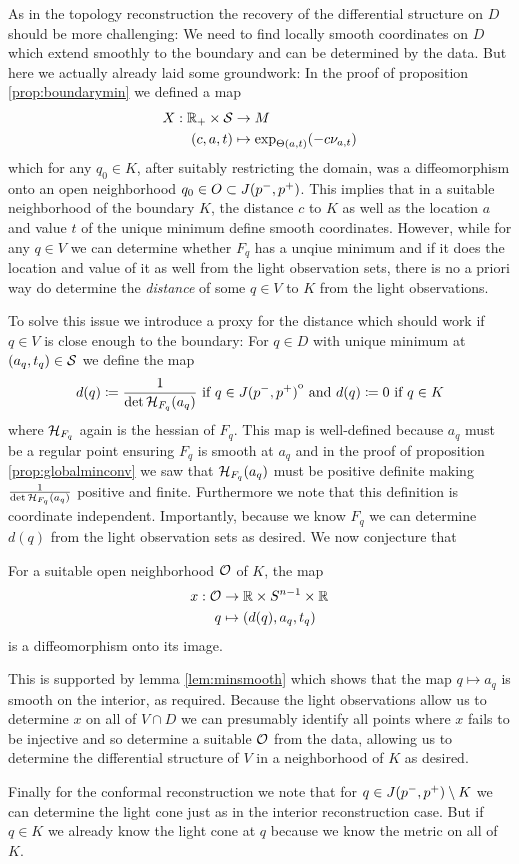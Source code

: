 As in the topology reconstruction the recovery of the differential structure on $D$ should be more challenging: We need to find locally smooth coordinates on $D$ which extend smoothly to the boundary and can be determined by the data. But here we actually already laid some groundwork: In the proof of proposition \ref{prop:boundarymin} we defined a map 
\begin{align*}
    X:\mathbb{R}_+\times {\mathcal{S}} &\to M \\
    (c,a,t)&\mapsto \exp_{\Theta(a,t)}(-c\nu_{a,t})
\end{align*}which for any $q_0\in K$, after suitably restricting the domain, was a diffeomorphism onto an open neighborhood $q_0\in O \subset J(p^-,p^+)$. This implies that in a suitable neighborhood of the boundary $K$, the distance $c$ to $K$ as well as the location $a$ and value $t$ of the unique minimum define smooth coordinates. However, while for any $q\in V$ we can determine whether $F_q$ has a unqiue minimum and if it does the location and value of it as well from the light observation sets, there is no a priori way do determine the \emph{distance} of some $q\in V$ to $K$ from the light observations. 

To solve this issue we introduce a proxy for the distance which should work if $q\in V$ is close enough to the boundary: For $q\in D$ with unique minimum at $(a_q,t_q)\in {\mathcal{S}}$ we define the map
\[
    d(q)\coloneqq  \frac{1}{\det {\mathcal{H}}_{F_q}(a_q)} \text{ if }q\in {\kern0ptJ(p^-,p^+)}^{\mathrm{o}} \text{ and }d(q)\coloneqq 0 \text{ if }q\in K
\] where ${\mathcal{H}}_{F_q}$ again is the hessian of $F_q$.
This map is well-defined because $a_q$ must be a regular point ensuring $F_q$ is smooth at $a_q$ and in the proof of proposition \ref{prop:globalminconv} we saw that ${\mathcal{H}}_{F_q}(a_q)$ must be positive definite making $\frac{1}{\det {\mathcal{H}}_{F_q}(a_q)}$ positive and finite. Furthermore we note that this definition is coordinate independent. Importantly, because we know $F_q$ we can determine $d(q)$ from the light observation sets as desired. We now conjecture that 
\begin{conjecture}
    For a suitable open neighborhood ${\mathcal{O}}$ of $K$, the map 
    \begin{align*}
        x:{\mathcal{O}}&\to \mathbb{R} \times {S^{n-1}} \times \mathbb{R}\\
        q &\mapsto (d(q),a_q,t_q)
    \end{align*} is a diffeomorphism onto its image.
\end{conjecture}
This is supported by lemma \ref{lem:minsmooth} which shows that the map $q\mapsto a_q$ is smooth on the interior, as required. Because the light observations allow us to determine $x$ on all of $V\cap D$ we can presumably identify all points where $x$ fails to be injective and so determine a suitable ${\mathcal{O}}$ from the data, allowing us to determine the differential structure of $V$ in a neighborhood of $K$ as desired.

Finally for the conformal reconstruction we note that for $q\in J(p^-,p^+)\setminus K$ we can determine the light cone just as in the interior reconstruction case. But if $q\in K$ we already know the light cone at $q$ because we know the metric on all of $K$.